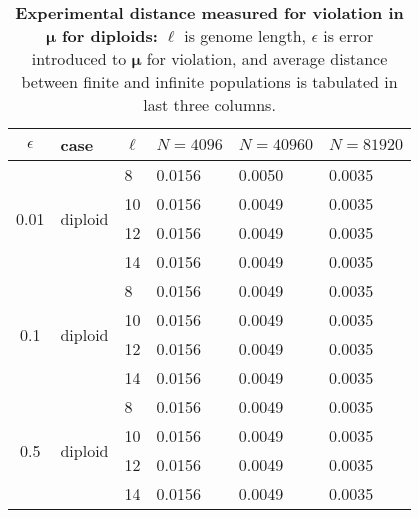 
\begin{table}[ht]
\caption{\textbf{Experimental distance measured for violation in $\bm{\mu}$ for diploids:} $\ell$ is genome length, 
$\epsilon$ is error introduced to $\bm{\mu}$ for violation, and average distance between finite and 
infinite populations is tabulated in last three columns.}
\centering
\begin{tabularx}{0.75\textwidth}{ c *{5}{X}}
\toprule
$\epsilon$ & case & $\ell$ & $N = 4096$ & $N = 40960$ & $N = 81920$ \\
\midrule
\multirow{4}{*}{0.01} & \multirow{4}{*}{diploid} 	& 8 & 0.0156	&  0.0050	& 0.0035 \\
		      &  	 			& 10 & 0.0156	&  0.0049	& 0.0035 \\
		      & 			 	& 12 & 0.0156	&  0.0049	& 0.0035 \\
		      &  	 			& 14 & 0.0156	&  0.0049	& 0.0035 \\
		      \midrule
\multirow{4}{*}{0.1}  & \multirow{4}{*}{diploid} 	& 8 & 0.0156	&  0.0049	& 0.0035 \\
		      &  	 			& 10 & 0.0156	&  0.0049	& 0.0035 \\
		      & 				& 12 & 0.0156	&  0.0049	& 0.0035 \\
		      &  	 			& 14 & 0.0156	&  0.0049	& 0.0035 \\
		      \midrule
\multirow{4}{*}{0.5}  & \multirow{4}{*}{diploid} 	& 8 & 0.0156	&  0.0049	& 0.0035 \\	
		      &  	 			& 10 & 0.0156	&  0.0049 	& 0.0035 \\
		      &  				& 12 & 0.0156	&  0.0049	& 0.0035 \\
		      &  	 			& 14 & 0.0156	&  0.0049	& 0.0035 \\
\bottomrule
\end{tabularx}
\label{distanceMuDip}
\end{table}